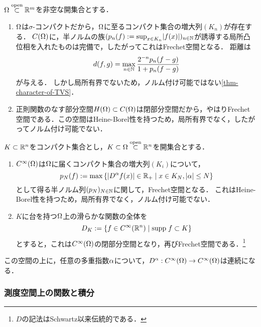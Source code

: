 \documentclass[uplatex,dvipdfmx]{jsreport}
\begin{document}
\begin{example}
    $\Omega\overset{\mathrm{open}}{\subset}\mathbb{R}^m$を非空な開集合とする．
    \begin{enumerate}
        \item $\Omega$は$\sigma$-コンパクトだから，$\Omega$に至るコンパクト集合の増大列$(K_n)$が存在する．
        $C(\Omega)$に，半ノルムの族$(p_n(f):=\sup_{x\in K_n}\lvert f(x)\rvert)_{n\in\mathbb{N}}$が誘導する局所凸位相を入れたものは完備で，したがってこれはFrechet空間となる．
        距離は
        \[d(f,g)=\max_{n\in\mathbb{N}}\frac{2^{-n}p_n(f-g)}{1+p_n(f-g)}\]
        が与える．
        しかし局所有界でないため，ノルム付け可能ではない\ref{thm-character-of-TVS}．
        \item 正則関数のなす部分空間$H(\Omega)\subset C(\Omega)$は閉部分空間だから，やはりFrechet空間である．この空間はHeine-Borel性を持つため，局所有界でなく，したがってノルム付け可能でない．
    \end{enumerate}
\end{example}

\begin{example}[滑らかな関数の空間と試験関数の空間]
    $K\subset\mathbb{R}^n$をコンパクト集合とし，$K\subset\Omega\overset{\mathrm{open}}{\subset}\mathbb{R}^n$を開集合とする．
    \begin{enumerate}
        \item  $C^\infty(\Omega)$は$\Omega$に届くコンパクト集合の増大列$(K_i)$について，
        \[p_N(f):=\max\left\{\lvert D^\alpha f(x)\rvert\in\mathbb{R}_+\mid x\in K_N,\lvert\alpha\rvert\le N\right\}\]
        として得る半ノルム列$(p_N)_{N\in\mathbb{N}}$に関して，Frechet空間となる．
        これはHeine-Borel性を持つため，局所有界でなく，ノルム付け可能でない．
        \item $K$に台を持つ$\Omega$上の滑らかな関数の全体を
        \[D_K:=\left\{f\in C^\infty(\mathbb{R}^n)\mid \mathrm{supp}\; f\subset K\right\}\]
        とすると，これは$C^\infty(\Omega)$の閉部分空間となり，再びFrechet空間である．\footnote{$D$の記法はSchwartz以来伝統的である．}
    \end{enumerate}
    この空間の上に，任意の多重指数$\alpha$について，$D^\alpha:C^\infty(\Omega)\to C^\infty(\Omega)$は連続になる．
\end{example}

\subsubsection{測度空間上の関数と積分}
\end{document}
